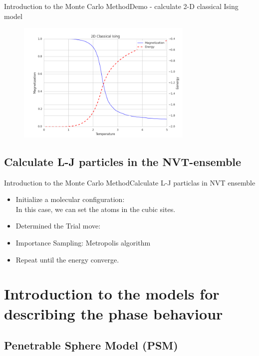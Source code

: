 \documentclass{beamer}
\begin{document}
\begin{frame}{Introduction to the Monte Carlo Method}{Demo - calculate 2-D classical Ising model}
	\begin{figure}[h]
		\includegraphics[width=0.75\textwidth]{figures/2DIsingEM.png}
		\label{2DI}
	\end{figure}
\end{frame}

\subsection{Calculate L-J particles in the NVT-ensemble}
\begin{frame}{Introduction to the Monte Carlo Method}{Calculate L-J particlas in NVT ensemble}

\begin{itemize}
	\item Initialize a molecular configuration: \\
		In this case, we can set the atoms in the cubic sites.
	\item Determined the Trial move:
	\item Importance Sampling: Metropolis algorithm
	\item Repeat until the energy converge.
\end{itemize}
\end{frame}

\section{Introduction to the models for describing the phase behaviour}

\subsection{Penetrable Sphere Model (PSM) }
\end{document}
